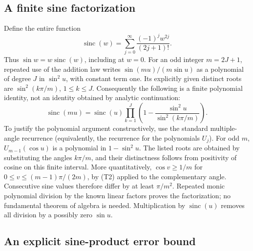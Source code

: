 \subsection{A finite sine factorization}

Define the entire function
\[
 \operatorname{sinc}(w)=\sum_{j=0}^{\infty}
                \frac{(-1)^jw^{2j}}{(2j+1)!}.
\]
Thus \(\sin w=w\operatorname{sinc}(w)\), including at \(w=0\).
For an odd integer \(m=2J+1\), repeated use of the addition law writes
\(\sin(mu)/(m\sin u)\) as a polynomial of degree \(J\) in
\(\sin^2u\), with constant term one. Its explicitly given distinct roots
are \(\sin^2(k\pi/m)\), \(1\le k\le J\). Consequently the following is
a finite polynomial identity, not an identity obtained by analytic
continuation:
\[
 \operatorname{sinc}(mu)=\operatorname{sinc}(u)
 \prod_{k=1}^{J}
 \left(1-\frac{\sin^2u}{\sin^2(k\pi/m)}\right).           \tag{T3}
\]
To justify the polynomial argument constructively, use the standard
multiple-angle recurrence (equivalently, the recurrence for the
polynomials \(U_j\)). For odd \(m\), \(U_{m-1}(\cos u)\) is a polynomial
in \(1-\sin^2u\). The listed roots are obtained by substituting the
angles \(k\pi/m\), and their distinctness follows from positivity of
cosine on this finite interval. More quantitatively,
\(\cos v\ge1/m\) for
\(0\le v\le(m-1)\pi/(2m)\), by (T2) applied to the complementary
angle. Consecutive sine values therefore differ by at least
\(\pi/m^2\). Repeated monic polynomial division by the known linear
factors proves the factorization; no fundamental theorem of algebra is
needed. Multiplication by \(\operatorname{sinc}(u)\) removes all
division by a possibly zero \(\sin u\).

\subsection{An explicit sine-product error bound}

